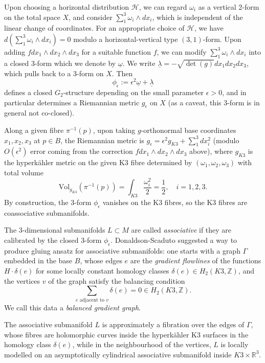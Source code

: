 \documentclass{article}
\theoremstyle{definition}
\newcommand{\R}{\mathbb{R}}
\newcommand{\Z}{\mathbb{Z}}
\begin{document}
		
		
		
	
		
		
	Upon choosing a horizontal distribution $\mathcal{H}$, we can regard $\omega_i$ as a vertical 2-form on the total space $X$, and consider $ \sum_1^3 \omega_i\wedge  dx_i$, which is independent of the linear change of coordinates. For an appropriate choice of $\mathcal{H}$, we have $d  (\sum_1^3 \omega_i\wedge  dx_i)=0$  modulo a horizontal-vertical type $(3,1)$-form. Upon adding $f dx_1\wedge dx_2\wedge dx_3$ for a suitable function $f$, we can modify $ \sum_1^3 \omega_i\wedge  dx_i$ into a closed 3-form which we denote by $\underline{\omega}$.
		We write $\underline{\lambda}= - \sqrt{\det(g)} dx_1dx_2dx_3$, which pulls back to a 3-form on $X$. Then 
	\[
	\phi_\epsilon := \epsilon^2 \underline{\omega}+ \underline{\lambda}
	\]
	defines  a closed $G_2$-structure depending on the small parameter $\epsilon>0$, and in particular determines a Riemannian metric $g_\epsilon$ on $X$ (as a caveat, this 3-form is in general not co-closed).  
	
	
	
	
	Along a given fibre $\pi^{-1}(p)$, upon taking $g$-orthonormal base coordinates $x_1, x_2, x_3$ at $p\in B$, the Riemannian metric is $g_\epsilon= \epsilon^2 g_{K3}+ \sum_1^3 dx_i^2$ (modulo $O(\epsilon^2)$ error coming from the correction $fdx_1\wedge dx_2\wedge dx_3$ above), where $g_{K3} $ is the hyperk\"ahler metric on the given K3 fibre determined by $(\omega_1, \omega_2,\omega_3)$ with total volume 
	\[
\text{Vol}_{g_{K3}}(\pi^{-1}(p) )=	\int_{K3} \frac{\omega_i^2}{2}= \frac{1}{2},\quad i=1,2,3.
	\]
	By construction, the 3-form $\phi_\epsilon$ vanishes on the K3 fibres, so the K3 fibres are coassociative submanifolds. 
		
		
		
		
	The 3-dimensional submanifolds $L\subset M$ are called \emph{associative} if they are calibrated by the closed 3-form $\phi_\epsilon$. Donaldson-Scaduto \cite{DonaldsonScaduto} suggested a way to produce gluing ansatz for associative submanifolds: one starts with a graph $\Gamma$ embedded in the base $B$, whose edges $e$ are the \emph{gradient flowlines} of the functions $H\cdot \delta(e)$ for some locally constant homology classes $\delta(e)\in H_2(K3,\Z)$, and the vertices $v$ of the graph satisfy the balancing condition
	\[
	\sum_{e \text{ adjacent to } v} \delta(e)=0\in H_2(K3, \Z).
	\]
	We call this data a \emph{balanced gradient graph}. 
	
	
	The associative submanifold $L$ is approximately a fibration over the edges of $\Gamma$, whose fibres are holomorphic curves inside the hyperk\"ahler K3 surfaces in the homology class $\delta(e)$, while in the neighbourhood of the vertices, $L$ is locally modelled on an asymptotically cylindrical associative submanifold inside $K3\times \R^3$. 
		
\end{document}
